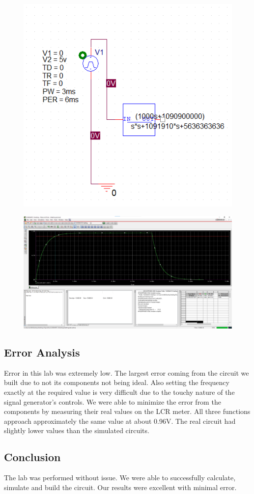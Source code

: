 \documentclass[11pt]{article}
\begin{document}
	\begin{figure}[H]
		\centering
		\includegraphics[width=5in]{images/simulation_schematic.png}
	\end{figure}
	\begin{figure}[H]
		\centering
		\includegraphics[width=5in]{images/laplace_part.png}
	\end{figure}
	
	
	\subsection*{Error Analysis}
	Error in this lab was extremely low. The largest error coming from the circuit we built due to not its components not being ideal. Also setting the frequency exactly at the required value is very difficult due to the touchy nature of the signal generator's controls. We were able to minimize the error from the components by measuring their real values on the LCR meter. All three functions approach approximately the same value at about 0.96V. The real circuit had slightly lower values than the simulated circuits.
	\subsection*{Conclusion}
	The lab was performed without issue. We were able to successfully calculate, simulate and build the circuit. Our results were excellent with minimal error. 
	
	
\end{document}
